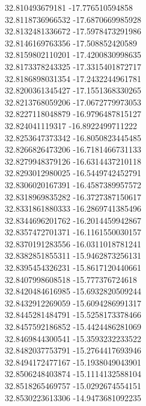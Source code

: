 {32.810493679181	-17.776510594858\\
32.8118736966532	-17.6870669985928\\
32.8132481336672	-17.5978473291986\\
32.8146169763356	-17.508852420589\\
32.8159802110201	-17.4200830998635\\
32.8173378243325	-17.3315401872717\\
32.8186898031354	-17.2432244961781\\
32.8200361345427	-17.1551368330265\\
32.8213768059206	-17.0672779973053\\
32.8227118048879	-16.9796487815127\\
32.824041119317	-16.8922499711222\\
32.8253647373342	-16.8050823445485\\
32.8266826473206	-16.7181466731133\\
32.8279948379126	-16.6314437210118\\
32.8293012980025	-16.5449742452791\\
32.8306020167391	-16.4587389957572\\
32.8318969835282	-16.3727387150617\\
32.8331861880333	-16.2869741385496\\
32.8344696201762	-16.2014459942867\\
32.8357472701371	-16.1161550030157\\
32.8370191283556	-16.0311018781241\\
32.8382851855311	-15.9462873256131\\
32.8395454326231	-15.8617120440661\\
32.8407998608518	-15.777376724618\\
32.8420484616985	-15.6932820509244\\
32.8432912269059	-15.6094286991317\\
32.8445281484791	-15.5258173378466\\
32.8457592186852	-15.4424486281069\\
32.8469844300541	-15.3593232233522\\
32.8482037753791	-15.2764417693946\\
32.8494172477167	-15.1938049043901\\
32.8506248403874	-15.1114132588104\\
32.8518265469757	-15.0292674554151\\
32.8530223613306	-14.9473681092235\\
}
